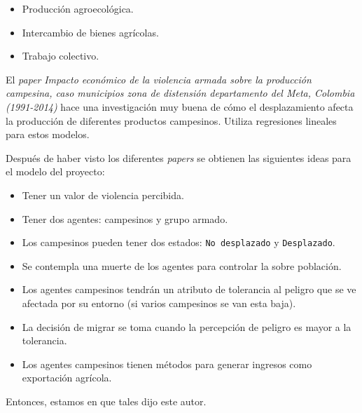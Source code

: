\documentclass[12pt]{article}
\begin{document}
\begin{itemize}
  \item Producción agroecológica.
  \item Intercambio de bienes agrícolas.
  \item Trabajo colectivo.
\end{itemize}

El \textit{paper} \textit{Impacto económico de la violencia armada sobre la producción campesina, caso municipios zona de distensión departamento del Meta, Colombia (1991-2014)}\cite{perez2016impacto} hace una investigación muy buena de cómo el desplazamiento afecta la producción de diferentes productos campesinos. Utiliza regresiones lineales para estos modelos.


Después de haber visto los diferentes \textit{papers} se obtienen las siguientes ideas para el modelo del proyecto:

\begin{itemize}
  \item Tener un valor de violencia percibida.
  \item Tener dos agentes: campesinos y grupo armado.
  \item Los campesinos pueden tener dos estados: \texttt{No desplazado} y \texttt{Desplazado}.
  \item Se contempla una muerte de los agentes para controlar la sobre población.
  \item Los agentes campesinos tendrán un atributo de tolerancia al peligro que se ve afectada por su entorno (si varios campesinos se van esta baja).
  \item La decisión de migrar se toma cuando la percepción de peligro es mayor a la tolerancia.
  \item Los agentes campesinos tienen métodos para generar ingresos como exportación agrícola.
\end{itemize}

Entonces, estamos en que tales dijo este autor.




\end{document}
